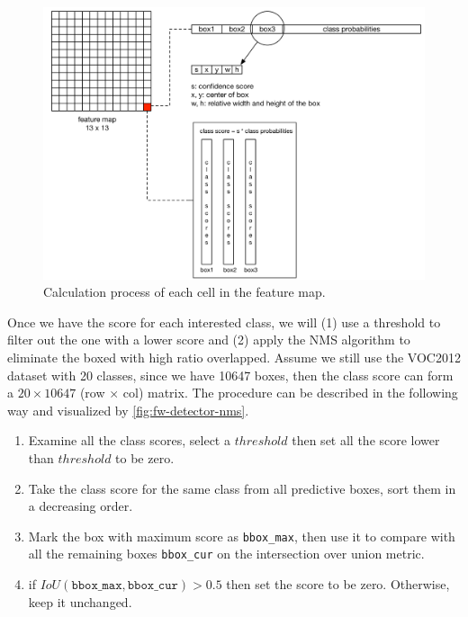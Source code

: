 \begin{figure}
    \includegraphics[width=\linewidth]{figures/framework_detector_calc.png}
    \caption{Calculation process of each cell in the feature map.}
    \label{fig:fw-detector-calc}
\end{figure}

Once we have the score for each interested class, we will (1) use a threshold to
filter out the one with a lower score and (2) apply the NMS algorithm to
eliminate the boxed with high ratio overlapped. Assume we still use the
VOC2012 dataset with 20 classes, since we have 10647 boxes, then the class score
can form a $20 \times 10647$ (row $\times$ col) matrix. The procedure can be
described in the following way and visualized by \autoref{fig:fw-detector-nms}.

\begin{enumerate}
    \item Examine all the class scores, select a $threshold$ then set all the
    score lower than $threshold$ to be zero.
    \item Take the class score for the same class from all predictive boxes,
    sort them in a decreasing order.
    \item Mark the box with maximum score as \texttt{bbox\_max}, then use it to
    compare with all the remaining boxes \texttt{bbox\_cur} on the intersection
    over union metric.
    \item if $IoU(\texttt{bbox\_max}, \texttt{bbox\_cur}) > 0.5$ then set the
    score to be zero. Otherwise, keep it unchanged.
\end{enumerate}

